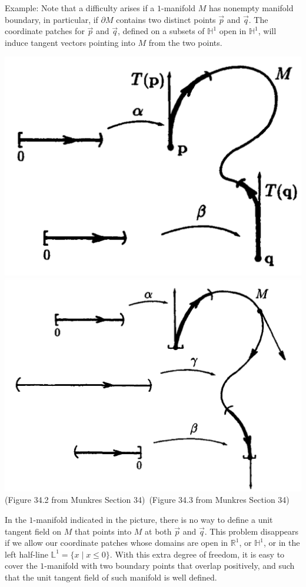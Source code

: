 \documentclass[15pt]{book}
\theoremstyle{break}
\theoremstyle{break}
\newcommand{\R}{\mathbb{R}}
\newcommand{\example}{\color{green}Example: \color{black}}
\begin{document}
\hfill\break
\example Note that a difficulty arises if a $1$-manifold $M$ has nonempty manifold boundary, in particular, if $\partial M$ contains two distinct points $\vec{p}$ and $\vec{q}$. The coordinate patches for $\vec{p}$ and $\vec{q}$, defined on a subsets of $\mathbb{H}^1$ open in $\mathbb{H}^1$, will induce tangent vectors pointing into $M$ from the two points. 
\begin{center}
\includegraphics[scale=0.18]{tangent1.png}\qquad\qquad \includegraphics[scale=0.23]{tangent1-1.png}\\
(Figure 34.2 from Munkres Section 34)\qquad\
(Figure 34.3 from Munkres Section 34)\quad
\end{center}
\hfill\break

In the $1$-manifold indicated in the picture, there is no way to define a unit tangent field on $M$ that points into $M$ at both $\vec{p}$ and $\vec{q}$. This problem disappears if we allow our coordinate patches whose domains are open in $\R^1$, or $\mathbb{H}^1$, or in  the left half-line $\mathbb{L}^1 = \{x \mid x\leq 0\}$. With this extra degree of freedom, it is easy to cover the $1$-manifold with two boundary points that overlap positively, and such that the unit tangent field of such manifold is well defined. \\
\end{document}
